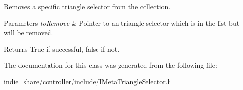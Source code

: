 Removes a specific triangle selector from the collection. 


\begin{DoxyParams}{Parameters}
{\em to\+Remove} & Pointer to an triangle selector which is in the list but will be removed. \\
\hline
\end{DoxyParams}
\begin{DoxyReturn}{Returns}
True if successful, false if not. 
\end{DoxyReturn}


The documentation for this class was generated from the following file\+:\begin{DoxyCompactItemize}
\item 
indie\+\_\+share/controller/include/I\+Meta\+Triangle\+Selector.\+h\end{DoxyCompactItemize}
